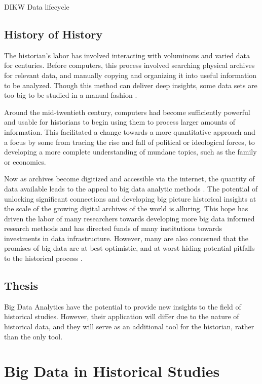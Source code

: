 \documentclass[sigconf]{acmart}
\begin{document}
DIKW Data lifecycle

\subsection{History of History}

The historian's labor has involved interacting with voluminous and varied data for centuries. Before computers, this process involved searching physical archives for relevant data, and manually copying and organizing it into useful information to be analyzed. Though this method can deliver deep insights, some data sets are too big to be studied in a manual fashion \cite{bdglobalhist}.

Around the mid-twentieth century, computers had become sufficiently powerful and usable  for historians to begin using them to process larger amounts of information. This facilitated a change towards a more quantitative approach and a focus by some from tracing the rise and fall of political or ideological forces, to developing a more complete understanding of mundane topics, such as the family or economics.

Now as archives become digitized and accessible via the internet, the quantity of data available leads to the appeal to big data analytic methods \cite{digitalrepublicletters}. The potential of unlocking significant connections and developing big picture historical insights at the scale of the growing digital archives of the world is alluring. This hope has driven the labor of many researchers towards developing more big data informed research methods and has directed funds of many institutions towards investments in data infrastructure. However, many are also concerned that the promises of big data are at best optimistic, and at worst hiding potential pitfalls to the historical process \cite{bdglobalhist}.

\subsection{Thesis}
Big Data Analytics have the potential to provide new insights to the field of historical studies. However, their application will differ due to the nature of historical data, and they will serve as an additional tool for the historian, rather than the only tool.

\section{Big Data in Historical Studies}
\end{document}

